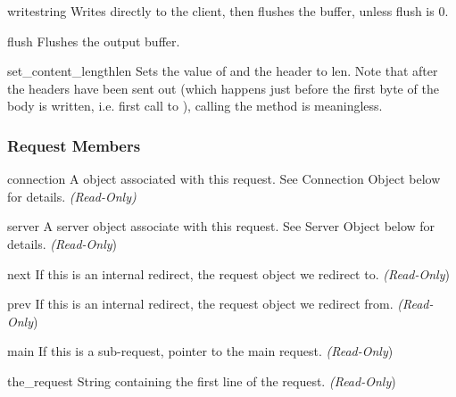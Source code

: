 \begin{methoddesc}[request]{write}{string}
  Writes  directly to the client, then flushes the buffer,
  unless flush is 0.
\end{methoddesc}

\begin{methoddesc}[request]{flush}{}
  Flushes the output buffer.
\end{methoddesc}

\begin{methoddesc}[request]{set_content_length}{len}
  Sets the value of  and the 
  header to len. Note that after the headers have been sent out (which
  happens just before the first byte of the body is written,
  i.e. first call to ), calling the method is
  meaningless.
\end{methoddesc}

\subsubsection{Request Members\label{pyapi-mprequest-mem}}

\begin{memberdesc}[request]{connection}
  A  object associated with this request. See
  Connection Object below for details.
  \emph{(Read-Only)}
\end{memberdesc}

\begin{memberdesc}[request]{server}
  A server object associate with this request. See Server Object below
  for details.
  \emph{(Read-Only})
\end{memberdesc}

\begin{memberdesc}[request]{next}
  If this is an internal redirect, the request object we redirect to. 
  \emph{(Read-Only})
\end{memberdesc}

\begin{memberdesc}[request]{prev}
  If this is an internal redirect, the request object we redirect from.
  \emph{(Read-Only})
\end{memberdesc}

\begin{memberdesc}[request]{main}
  If this is a sub-request, pointer to the main request. 
  \emph{(Read-Only})
\end{memberdesc}

\begin{memberdesc}[request]{the_request}
  String containing the first line of the request.
  \emph{(Read-Only})
\end{memberdesc}

